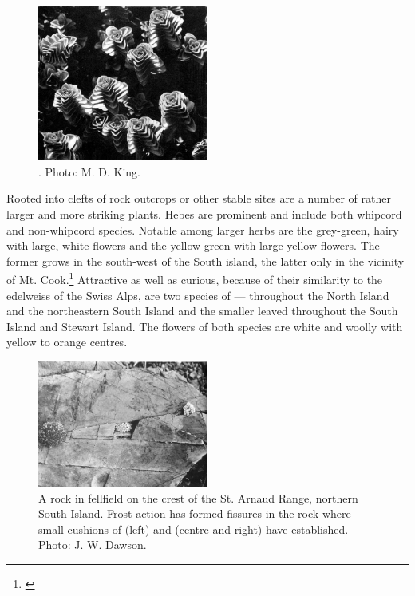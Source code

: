 \begin{figure}
	\includegraphics[width=0.5\textwidth]{graphics/figure106hebe.jpg}
	\centering
	\caption[Hebe epacridea]{.
	Photo: M. D. King.}
	\label{fig:106hebe}
\end{figure}

Rooted into clefts of rock outcrops or other stable sites are a number of rather larger and more striking plants.
Hebes are prominent and include both whipcord and non-whipcord species.
Notable among larger herbs are the grey-green, hairy  with large, white flowers and the yellow-green  with large yellow flowers.
The former grows in the south-west of the South island, the latter only in the vicinity of Mt.
Cook.\footnote{\cite{wilson1978wild}}
Attractive as well as curious, because of their similarity to the edelweiss of the Swiss Alps, are two species of  —  throughout the North Island and the northeastern South Island and the smaller leaved  throughout the South Island and Stewart Island.
The flowers of both species are white and woolly with yellow to orange centres.

\begin{figure}
	\includegraphics[width=0.5\textwidth]{graphics/figure107fellfield-rock.jpg}
	\centering
	\caption[A rock in fellfield on the crest of the St. Arnaud Range]{A rock in fellfield on the crest of the St. Arnaud Range, northern South Island.
    Frost action has formed fissures in the rock where small cushions of  (left) and  (centre and right) have established.
	Photo: J. W. Dawson.}
	\label{fig:107fellfield-rock}
\end{figure}

